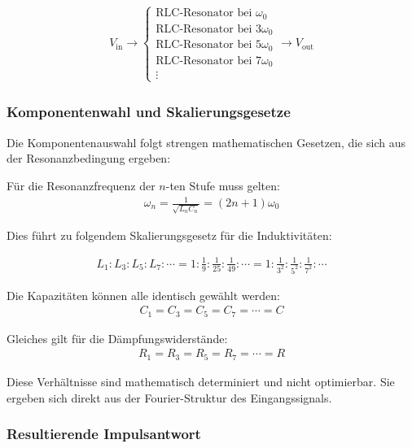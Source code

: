 \documentclass[a4paper,12pt,twoside]{report}
\theoremstyle{definition}
\begin{document}
\begin{align}
	V_{\text{in}} \longrightarrow \begin{cases}
		\text{RLC-Resonator bei } \omega_0 \\
		\text{RLC-Resonator bei } 3\omega_0 \\
		\text{RLC-Resonator bei } 5\omega_0 \\
		\text{RLC-Resonator bei } 7\omega_0 \\
		\vdots
	\end{cases} \longrightarrow V_{\text{out}}
\end{align}

\subsubsection*{Komponentenwahl und Skalierungsgesetze}

Die Komponentenauswahl folgt strengen mathematischen Gesetzen, die sich aus der Resonanzbedingung ergeben:

Für die Resonanzfrequenz der $n$-ten Stufe muss gelten:
\begin{align}
	\omega_n = \frac{1}{\sqrt{L_n C_n}} = (2n+1) \omega_0
\end{align}

Dies führt zu folgendem Skalierungsgesetz für die Induktivitäten:

\begin{align}
	L_1 : L_3 : L_5 : L_7 : \cdots = 1 : \frac{1}{9} : \frac{1}{25} : \frac{1}{49} : \cdots = 1 : \frac{1}{3^2} : \frac{1}{5^2} : \frac{1}{7^2} : \cdots
\end{align}

Die Kapazitäten können alle identisch gewählt werden:
\begin{align}
	C_1 = C_3 = C_5 = C_7 = \cdots = C
\end{align}

Gleiches gilt für die Dämpfungswiderstände:
\begin{align}
	R_1 = R_3 = R_5 = R_7 = \cdots = R
\end{align}

Diese Verhältnisse sind mathematisch determiniert und nicht optimierbar. Sie ergeben sich direkt aus der Fourier-Struktur des Eingangssignals.

\subsubsection*{Resultierende Impulsantwort}
\end{document}
